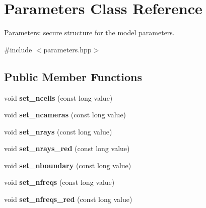 \hypertarget{classParameters}{}\section{Parameters Class Reference}
\label{classParameters}


\mbox{\hyperlink{classParameters}{Parameters}}\+: secure structure for the model parameters.  




{\ttfamily \#include $<$parameters.\+hpp$>$}

\subsection*{Public Member Functions}
\begin{DoxyCompactItemize}
\item 
\mbox{\label{classParameters_a62a78a811449d5eae3f7dd0b6426b3e5}} 
void {\bfseries set\+\_\+ncells} (const long value)
\item 
\mbox{\label{classParameters_a9897caabb65e87e4c934179c4a21b8b2}} 
void {\bfseries set\+\_\+ncameras} (const long value)
\item 
\mbox{\label{classParameters_a91c99ccecbc13e9502424284639f97f9}} 
void {\bfseries set\+\_\+nrays} (const long value)
\item 
\mbox{\label{classParameters_a37cd7ed199e2881848d392ff5868e6bb}} 
void {\bfseries set\+\_\+nrays\+\_\+red} (const long value)
\item 
\mbox{\label{classParameters_a74485125ea038240b2eb54780961c970}} 
void {\bfseries set\+\_\+nboundary} (const long value)
\item 
\mbox{\label{classParameters_a5626c4070761626dc2765cb7791798fa}} 
void {\bfseries set\+\_\+nfreqs} (const long value)
\item 
\mbox{\label{classParameters_ac01bc63944bdadeb86d8664537d0febe}} 
void {\bfseries set\+\_\+nfreqs\+\_\+red} (const long value)
\item 
\mbox{\label{classParameters_adf5f01e44bf7d5df59d6010fb9782afb}} 

\end{DoxyCompactItemize}
